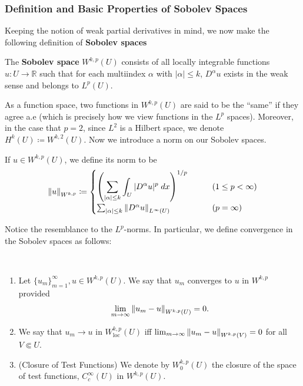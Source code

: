 \documentclass{article}
\numberwithin{equation}{section}
\begin{document}
	\subsubsection{Definition and Basic Properties of Sobolev Spaces}
	Keeping the notion of weak partial derivatives in mind, we now make the following definition of \textbf{Sobolev spaces}
	\begin{definition}
		The \textbf{Sobolev space} $W^{k,p}(U)$ consists of all locally integrable functions $u: U \to \mathbb{R}$ such that for each multiindex $\alpha$ with $|\alpha|\leq k$, $D^\alpha u$ exists in the weak sense and belongs to $L^p(U)$. 
	\end{definition}
	
	As a function space, two functions in $W^{k,p}(U)$ are said to be the ``same'' if they agree a.e (which is precisely how we view functions in the $L^p$ spaces). Moreover, in the case that $p = 2$, since $L^2$ is a Hilbert space, we denote $H^k(U) \coloneqq W^{k,2}(U)$. Now we introduce a norm on our Sobolev spaces. 
	
	\begin{definition}
		If $u \in W^{k,p}(U)$, we define its norm to be 
		\begin{equation}
			\left\Vert u \right\Vert_{W^{k,p}} \coloneqq
			\begin{cases}
				\displaystyle\left(\sum_{|\alpha|\leq k}\int_{U}|D^\alpha u|^{p}\;dx\right)^{1/p} &\qquad (1 \leq p < \infty) \\
				\sum_{|\alpha|\leq k}\left\Vert D^\alpha u \right\Vert_{L^\infty(U)} &\qquad (p = \infty)
			\end{cases}
		\end{equation}  
	\end{definition}
	
	Notice the resemblance to the $L^p$-norms. In particular, we define convergence in the Sobolev spaces as follows: 
	\begin{definition}
		$ $\newline \vspace{-0.65cm}
		\begin{enumerate}[itemsep =-2pt,label = (\roman{*})]
			\item Let $\{u_{m}\}_{m = 1}^{\infty}, u \in W^{k,p}(U)$. We say that $u_{m}$ converges to $u$ in $W^{k,p}$ provided 
			\begin{equation}
				\lim_{m \to \infty}\left\Vert u_{m} - u \right\Vert_{W^{k,p}(U)} = 0. 
			\end{equation}
			\item We say that $u_{m}\to u$ in $W^{k,p}_{\text{loc}}(U)$ iff $\lim_{m \to \infty}\left\Vert u_{m} - u \right\Vert_{W^{k,p}(V)} = 0$ for all $V \Subset U$. 
			\item (Closure of Test Functions) We denote by $W_{0}^{k,p}(U)$ the closure of the space of test functions, $C_{c}^{\infty}(U)$ in $W^{k,p}(U)$. 
		\end{enumerate}
	\end{definition}
	
\end{document}

